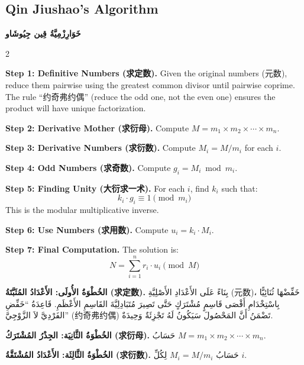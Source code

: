 \documentclass[11pt,a4paper]{article}
\newcommand{\ar}[1]{\arabicfont\beginR #1\endR}
\providecommand{\enquote}[1]{``#1''}
\newcommand{\zhtext}[1]{{\chinese #1}}
\newenvironment{bilingual}{%
  \begin{paracol}{2}
}{%
  \end{paracol}
}
\begin{document}
\vspace{1em}

\subsection{Qin Jiushao's Algorithm}
\ar{\textbf{خَوَارِزْمِيَّةُ قِين جِيُوشَاو}}

\begin{bilingual}

\begin{leftcolumn*}
\textbf{Step 1: Definitive Numbers (\zhtext{求定数}).} Given the original numbers (\zhtext{元数}), reduce them pairwise using the greatest common divisor until pairwise coprime. The rule ``\zhtext{约奇弗约偶}'' (reduce the odd one, not the even one) ensures the product will have unique factorization.

\textbf{Step 2: Derivative Mother (\zhtext{求衍母}).} Compute $M = m_1 \times m_2 \times \cdots \times m_n$.

\textbf{Step 3: Derivative Numbers (\zhtext{求衍数}).} Compute $M_i = M / m_i$ for each $i$.

\textbf{Step 4: Odd Numbers (\zhtext{求奇数}).} Compute $g_i = M_i \bmod m_i$.

\textbf{Step 5: Finding Unity (\zhtext{大衍求一术}).} For each $i$, find $k_i$ such that:
\[k_i \cdot g_i \equiv 1 \pmod{m_i}\]
This is the modular multiplicative inverse.

\textbf{Step 6: Use Numbers (\zhtext{求用数}).} Compute $u_i = k_i \cdot M_i$.

\textbf{Step 7: Final Computation.} The solution is:
\[N = \sum_{i=1}^{n} r_i \cdot u_i \pmod{M}\]
\end{leftcolumn*}

\begin{rightcolumn*}
\ar{\textbf{الخُطْوَةُ الأُولَى: الأَعْدَادُ المُثَبَّتَةُ (求定数).} بِنَاءً عَلَى الأَعْدَادِ الأَصْلِيَّةِ (元数)، خَفِّضْهَا ثُنَائِيًّا بِاسْتِخْدَامِ أَقْصَى قَاسِمٍ مُشْتَرَكٍ حَتَّى تَصِيرَ مُتَبَادِلِيَّةَ القَاسِمِ الأَعْظَمِ. قَاعِدَةُ \enquote{خَفِّضِ الفَرْدِيَّ لاَ الزَّوْجِيَّ} (约奇弗约偶) تَضْمَنُ أَنَّ المَحْصُولَ سَيَكُونُ لَهُ تَجْزِئَةٌ وَحِيدَةٌ.}

\ar{\textbf{الخُطْوَةُ الثَّانِيَة: الجِذْرُ المُشْتَرَكُ (求衍母).} حَسَابُ $M = m_1 \times m_2 \times \cdots \times m_n$.}

\ar{\textbf{الخُطْوَةُ الثَّالِثَة: الأَعْدَادُ المُشْتَقَّةُ (求衍数).} حَسَابُ $M_i = M / m_i$ لِكُلِّ $i$.}


\end{rightcolumn*}
\end{bilingual}
\end{document}
